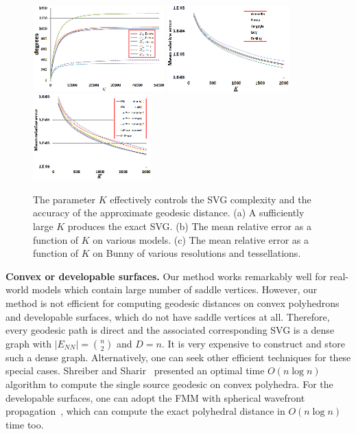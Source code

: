 \begin{figure}[htbp]
\centering
\includegraphics[height=1.3in]{figs/svg/bunny_lucy_k_curve.png}
\includegraphics[height=1.3in]{figs/svg/error_all_models.png}
\includegraphics[height=1.3in]{figs/svg/bunny_error.png}\\
\vspace{-0.1in} \caption{The parameter $K$ effectively controls
the SVG complexity and the accuracy of the approximate geodesic
distance. (a) A sufficiently large $K$ produces the exact SVG. (b)
The mean relative error as a function of $K$ on various models. (c)
The mean relative error as a function of $K$ on Bunny of various
resolutions and tessellations. } \label{fig:K}
\end{figure}

\noindent\textbf{Convex or developable surfaces.} Our method works
remarkably well for real-world models which contain large number of
saddle vertices. However, our method is not efficient for computing
geodesic distances on convex polyhedrons and developable surfaces,
which do not have saddle vertices at all. Therefore, every geodesic
path is direct and the associated corresponding SVG is a dense graph
with $|E_{NN}|={n\choose 2}$ and $D=n$. It is very expensive to
construct and store such a dense graph. Alternatively, one can seek
other efficient techniques for these special cases. Shreiber and
Sharir~\cite{Schreiber:2006} presented an optimal time $O(n\log
n)$ algorithm to compute the single source geodesic on convex
polyhedra. For the developable surfaces, one can adopt the FMM with
spherical wavefront propagation~\cite{sphericalwavefront}, which can
compute the exact polyhedral distance in $O(n\log n)$ time too.




